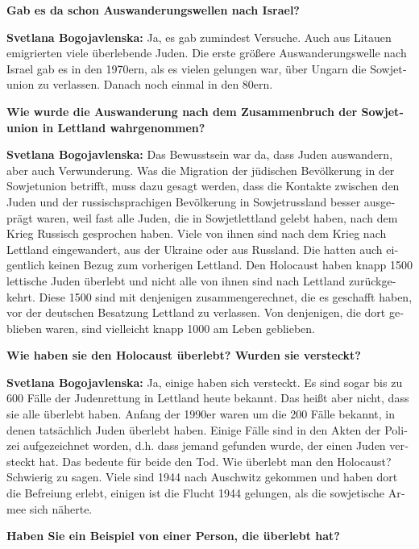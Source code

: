 \begin{otherlanguage}{ngerman}
\textbf{Gab es da schon Auswanderungswellen nach Israel?}

\textbf{Svetlana Bogojavlenska:} Ja, es gab zumindest Versuche. Auch aus Litauen emigrierten viele überlebende Juden. Die erste größere Auswanderungswelle nach Israel gab es in den 1970ern, als es vielen gelungen war, über Ungarn die Sowjetunion zu verlassen. Danach noch einmal in den 80ern. 

\textbf{Wie wurde die Auswanderung nach dem Zusammenbruch der Sowjetunion in Lettland wahrgenommen?}

\textbf{Svetlana Bogojavlenska:} Das Bewusstsein war da, dass Juden auswandern, aber auch Verwunderung. Was die Migration der jüdischen Bevölkerung in der Sowjetunion betrifft, muss dazu gesagt werden, dass die Kontakte zwischen den Juden und der russischsprachigen Bevölkerung in Sowjetrussland besser ausgeprägt waren, weil fast alle Juden, die in Sowjetlettland gelebt haben, nach dem Krieg Russisch gesprochen haben. Viele von ihnen sind nach dem Krieg nach Lettland eingewandert, aus der Ukraine oder aus Russland. Die hatten auch eigentlich keinen Bezug zum vorherigen Lettland. Den Holocaust haben knapp 1500 lettische Juden überlebt und nicht alle von ihnen sind nach Lettland zurückgekehrt. Diese 1500 sind mit denjenigen zusammengerechnet, die es geschafft haben, vor der deutschen Besatzung Lettland zu verlassen. Von denjenigen, die dort geblieben waren, sind vielleicht knapp 1000 am Leben geblieben.

\textbf{Wie haben sie den Holocaust überlebt? Wurden sie versteckt?}

\textbf{Svetlana Bogojavlenska:} Ja, einige haben sich versteckt. Es sind sogar bis zu 600 Fälle der Judenrettung in Lettland heute bekannt. Das heißt aber nicht, dass sie alle überlebt haben. Anfang der 1990er waren um die 200 Fälle bekannt, in denen tatsächlich Juden überlebt haben. Einige Fälle sind in den Akten der Polizei aufgezeichnet worden, d.h. dass jemand gefunden wurde, der einen Juden versteckt hat. Das bedeute für beide den Tod. Wie überlebt man den Holocaust? Schwierig zu sagen. Viele sind 1944 nach Auschwitz gekommen und haben dort die Befreiung erlebt, einigen ist die Flucht 1944 gelungen, als die sowjetische Armee sich näherte.

\textbf{Haben Sie ein Beispiel von einer Person, die überlebt hat?}


\end{otherlanguage}
